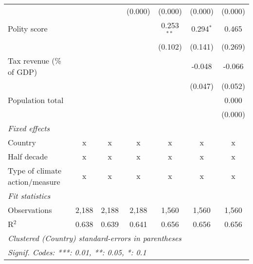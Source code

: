 \begin{tabular}{lcccccc}
                                                                                        &             &               & (0.000)        & (0.000)        & (0.000)        & (0.000)\\   
   Polity score                                                                         &             &               &                & 0.253$^{**}$   & 0.294$^{*}$    & 0.465\\   
                                                                                        &             &               &                & (0.102)        & (0.141)        & (0.269)\\   
   Tax revenue (\% of GDP)                                                              &             &               &                &                & -0.048         & -0.066\\   
                                                                                        &             &               &                &                & (0.047)        & (0.052)\\   
   Population total                                                                     &             &               &                &                &                & 0.000\\   
                                                                                        &             &               &                &                &                & (0.000)\\   
   \emph{Fixed effects}\\
   Country                                                                              & x           & x             & x              & x              & x              & x\\  
   Half decade                                                                          & x           & x             & x              & x              & x              & x\\  
   Type of climate action/measure                                                       & x           & x             & x              & x              & x              & x\\  
   \midrule \emph{Fit statistics}\\
   Observations                                                                         & 2,188       & 2,188         & 2,188          & 1,560          & 1,560          & 1,560\\  
   R$^2$                                                                                & 0.638       & 0.639         & 0.641          & 0.656          & 0.656          & 0.656\\  
   \midrule
   \multicolumn{7}{l}{\emph{Clustered (Country) standard-errors in parentheses}}\\
   \multicolumn{7}{l}{\emph{Signif. Codes: ***: 0.01, **: 0.05, *: 0.1}}\\
\end{tabular}
\par\endgroup


